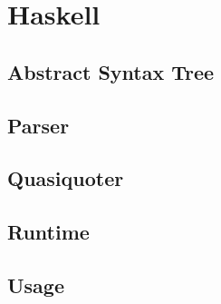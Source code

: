 \section{Haskell}

\subsection{Abstract Syntax Tree}



\subsection{Parser}



\subsection{Quasiquoter}



\subsection{Runtime}



\subsection{Usage}


